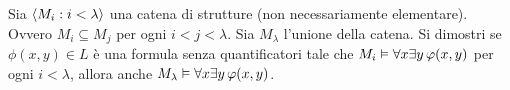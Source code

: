 \begin{exercise}
Sia  $\langle M_i:i<\lambda\rangle$ una catena di strutture (non necessariamente elementare). Ovvero $M_i\subseteq M_j$ per ogni $i<j<\lambda$. Sia $M_\lambda$ l'unione della catena. Si dimostri se $\phi(x,y)\in L$ \`e una formula senza quantificatori tale che $M_i\vDash\forall x\exists y\,\varphi(x,y)$ per ogni $i<\lambda$, allora anche $M_\lambda\vDash\forall x\exists y\,\varphi(x,y)$.\QED
\end{exercise}





%

\begin{comment}
Quindi assumiamo l'antecendete e definiamo per induzione transfinita una catena di insiemi $B_i$ con le seguenti propriet\`a:
\begin{itemize}
\item[1.]\noindent\smash{$\displaystyle B_i\subseteq \bigcup_{j<i} A_j$}\ \ \ e\ \ \  $B_i\cap A_j\neq \0$ per ogni $j<i$
\item[2.]per ogni $J\subseteq\lambda$ finito, esiste un filtro $F$ tale che \smash{$B_i\ \subseteq\ F\ \in\ \displaystyle\bigcap_{i\in J}\big[A_i\big]_\PP$}.
\end{itemize}
\`E immediato che un qualsiasi filtro primo che contiene $B_\lambda$ dimostra il lemma. Cominciamo con fissare $B_0=\0$, l'unica scelta che soddisfa \ssf{1}. Per ipotesi questa scelta soddisfa \ssf{2}. Supponiamo di avere gi\`a costruito $B_i$ con le propriet\`a richieste per ogni $i<\alpha$ e definiamo $B_\alpha$. Se $\alpha$ \`e un ordinale limite, \`e sufficente porre

\ceq{$B_\alpha$}{$\deq$}{$\displaystyle\bigcup_{i<\alpha} B_i$.}

\`E immediato verificare che questa definizione preserva due propriet\`a richieste. Se $\alpha$ \`e successore, diciamo $\alpha=i+1$ allora dobbiamo mostrare che per qualche $a\in A_i$ l'insieme $B_{i+1}=B_i\cup\{a\}$ verifica \ssf{2}. Argomentiamo per assurdo. Assumniamo che per ogni $a\in A_i$ esiste un $J_a\subseteq\lambda$ finito tale che $B_i\cup\{a\}\ \nsubseteq\ F$ per ogni \smash{$F\ \in\ \displaystyle\bigcap_{j\in J_a}\big[A_j\big]_\PP$}. Quindi, con $J=\displaystyle\{i\}\cup\bigcap_{a\in A_i}J_a$, contradiciamo l'ipotesi induttiva.
\end{proof}




\end{comment}